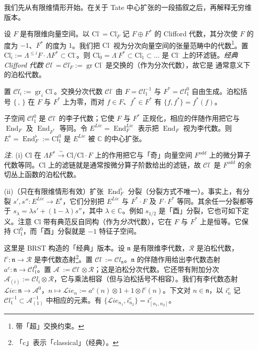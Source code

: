 我们先从有限维情形开始。在关于 Tate 中心扩张的一段插叙之后，再解释无穷维版本。

 设 $F$ 是有限维向量空间。以 $\mathrm{Cl}^{\cdot}=\mathrm{Cl}^{\cdot}_F$ 记 $F\oplus F^{*}$ 的 Clifford 代数，其分次使 $F$ 的度为 $-1$、$F^{*}$ 的度为 $1$。我们把 $\mathrm{Cl}^{\cdot}$ 视为分次向量空间的张量范畴中的代数\footnote{带「超」交换约束。}。置 $\mathrm{Cl}^{\cdot}_i:=\Lambda^{\le i}F\cdot\Lambda F^{*}\subset\mathrm{Cl}^{\cdot}$。则 $\mathrm{Cl}^{\cdot}_0=\Lambda^{\cdot}F^{*}\subset\mathrm{Cl}^{\cdot}_1\subset\ldots$ 是 $\mathrm{Cl}^{\cdot}$ 上的环滤链。\emph{经典 Clifford 代数} $\mathcal{C}l^{\cdot}=\mathcal{C}l^{\cdot}_F:=\operatorname{gr}\mathrm{Cl}^{\cdot}$ 是交换的（作为分次代数），故它是%
通常意义下的泊松代数。

置 $\mathcal{C}l^{\cdot}_i:=\operatorname{gr}_i\mathrm{Cl}^{\cdot}$。交换分次代数 $\mathcal{C}l^{\cdot}$ 由 $F=\mathcal{C}l^{-1}_1$ 与 $F^{*}=\mathcal{C}l^{0}_1$ 自由生成。泊松括号 $\{\,,\,\}$ 在 $F$ 与 $F^{*}$ 上为零，而对 $f\in F$、$f^{*}\in F^{*}$ 有 $\{f,f^{*}\}=f^{*}(f)$。

子空间 $\mathcal{C}l^{0}_1$ 是 $\mathcal{C}l^{\cdot}$ 的李子代数；它使 $F$ 与 $F^{*}$ 正规化，相应的伴随作用把它与 $\operatorname{End}_F$ 及 $\operatorname{End}_{F^{*}}$ 等同。令 $E^{Lie}=\operatorname{End}^{Lie}_F$ 表示把 $\operatorname{End}_F$ 视为李代数。则 $E^{\flat}=\operatorname{End}^{\flat}_F:=\mathrm{Cl}^{0}_1$ 是 $E^{Lie}$ 被 $\mathbb{C}$ 的中心扩张。

\emph{注.} (i) $\mathrm{Cl}$ 在 $\Lambda F^{*}\xrightarrow{\sim}\mathrm{Cl}/\mathrm{Cl}\cdot F$ 上的作用把它与「奇」向量空间 $F^{odd}$ 上的微分算子代数等同。$\mathrm{Cl}$ 上的滤链就是通常按微分算子阶数给出的滤链，故 $\mathcal{C}l^{\cdot}$ 是 $F^{odd}$ 的余切丛上函数的泊松代数。

(ii)（只在有限维情形有效）扩张 $\operatorname{End}^{\flat}_F$ 分裂（分裂方式不唯一）。事实上，有分裂 $s',s'':E^{Lie}\to E^{\flat}$，它们分别把 $E^{Lie}$ 与 $F^{*}\cdot F$ 及 $F\cdot F^{*}$ 等同。其余任一分裂都等于 $s_{\lambda}=\lambda s'+(1-\lambda)s''$，其中 $\lambda\in\mathbb{C}$。例如 $s_{1/2}$ 是「酉」分裂，它也可如下定义。注意 $\mathrm{Cl}$ 带有典范反自同构（作为\emph{分次}代数），它在 $F$ 与 $F^{*}$ 上是恒等。它保持 $\mathrm{Cl}^{0}_1$，而「酉」分裂就是 $-1$ 特征子空间。

 这里是 BRST 构造的「经典」版本。设 $\mathfrak{n}$ 是有限维李代数，$\mathcal{R}$ 是泊松代数，$l^{c}:\mathfrak{n}\to\mathcal{R}$ 是李代数态射\footnote{「c」表示「classical」（经典）。}。置 $\mathcal{C}l^{\cdot}:=\mathcal{C}l^{\cdot}_{\mathfrak{n}}$。$\mathfrak{n}$ 的伴随作用给出李代数态射 $a^{c}:\mathfrak{n}\to\mathcal{C}l^{0}_1$。置 $\mathcal{A}^{\cdot}:=\mathcal{C}l^{\cdot}\otimes\mathcal{R}$；这是泊松分次代数。它还带有附加分次 $\mathcal{A}^{\cdot}_{(i)}:=\mathcal{C}l^{\cdot}_i\otimes\mathcal{R}$，它与乘法相容（但与泊松括号不相容）。我们有李代数态射 $\mathcal{L}ie:\mathfrak{n}\to\mathcal{A}^{0}$，$n\mapsto\mathcal{L}ie_n:=a^{c}(n)\otimes 1+1\otimes l^{c}(n)$。下文对 $n\in\mathfrak{n}$，以 $i^{c}_n$ 记 $\mathcal{C}l^{-1}_1\subset\mathcal{A}^{-1}_{(1)}$ 中相应的元素。有 $\{\mathcal{L}ie_{n_1},i^{c}_{n_2}\}=i^{c}_{[n_1,n_2]}$。

